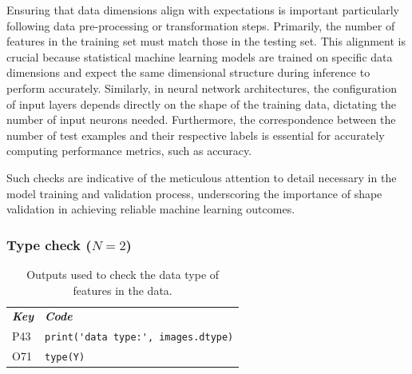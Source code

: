 Ensuring that data dimensions align with expectations is important particularly following data pre-processing or transformation steps. Primarily, the number of features in the training set must match those in the testing set. This alignment is crucial because statistical machine learning models are trained on specific data dimensions and expect the same dimensional structure during inference to perform accurately. Similarly, in neural network architectures, the configuration of input layers depends directly on the shape of the training data, dictating the number of input neurons needed. Furthermore, the correspondence between the number of test examples and their respective labels is essential for accurately computing performance metrics, such as accuracy.

Such checks are indicative of the meticulous attention to detail necessary in the model training and validation process, underscoring the importance of shape validation in achieving reliable machine learning outcomes.


\subsubsection{Type check ($N = 2$)}

\begin{table}
  \centering
  \caption{Outputs used to check the data type of features in the data.}
  \begin{tabular}{@{}m{} m{}@{}}
    \toprule
    \emph{\textbf{Key}} &
    \emph{\textbf{Code}}\\

    P43&
    \lstinline[]$print('data type:', images.dtype)$\\

    O71&
    \lstinline[]$type(Y)$\\
    \bottomrule
  \end{tabular}
  \label{tab:type-check}
\end{table}

